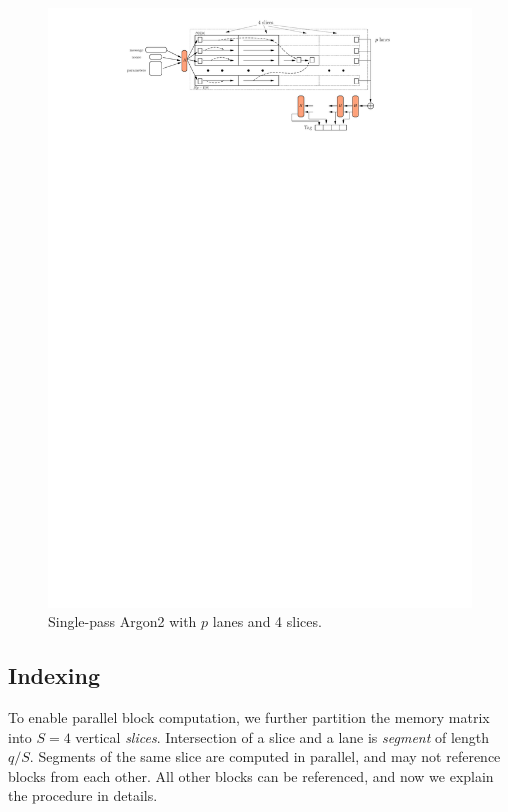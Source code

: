 \documentclass[a4paper]{article}
\begin{document}
 \begin{figure}[ht]
  \ifpdf
\begin{center}
  \includegraphics[scale=0.3]{pics/argon2-par.pdf}
  \caption{Single-pass \textsf{Argon2} with $p$ lanes and 4 slices. }\label{fig:argon2}
\end{center}
\fi
  \end{figure}

\subsection{Indexing}\label{sec:index}

To enable parallel block computation, we further partition the memory matrix into  $S=4$ vertical \emph{slices}. Intersection of a slice and a lane is \emph{segment} of length $q/S$.  Segments of the same slice
  are computed in parallel, and may not reference blocks from each other. All other blocks can be referenced, and now we explain the procedure in details.
\end{document}
